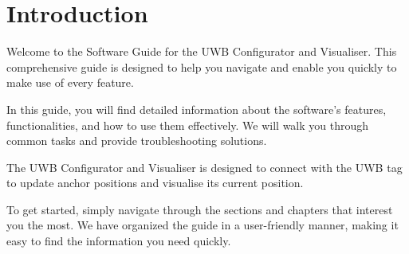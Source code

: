 \chapter{Introduction}

Welcome to the Software Guide for the UWB Configurator and Visualiser. This comprehensive guide is designed to help you navigate and enable you quickly to make use of every feature. 

In this guide, you will find detailed information about the software's features, functionalities, and how to use them effectively. We will walk you through common tasks and provide troubleshooting solutions.

The UWB Configurator and Visualiser is designed to connect with the UWB tag to update anchor positions and visualise its current position. 

To get started, simply navigate through the sections and chapters that interest you the most. We have organized the guide in a user-friendly manner, making it easy to find the information you need quickly.
